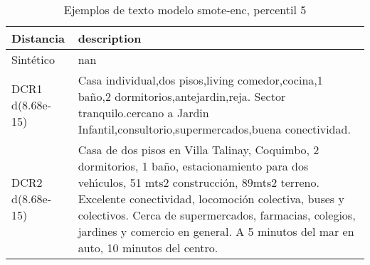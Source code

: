 \begin{table}[H]
\centering
\fontsize{10}{14}\selectfont
\caption{Ejemplos de texto modelo smote-enc, percentil 5}
\label{table-example-economicos-b-2-smote-enc-5p-text}
\begin{tabular}{|l|m{35em}|}
\hline
\rowcolor[gray]{0.8}
Distancia & description \\
\hline Sintético & nan \\
\hline DCR1 d(8.68e-15) & Casa individual,dos pisos,living comedor,cocina,1 ba\~no,2 dormitorios,antejardin,reja.    Sector tranquilo.cercano a Jardin Infantil,consultorio,supermercados,buena conectividad. \\
\hline DCR2 d(8.68e-15) & Casa de dos pisos en Villa Talinay, Coquimbo, 2 dormitorios, 1 ba\~no, estacionamiento para dos veh{\'\i}culos, 51 mts2 construcci\'on, 89mts2 terreno. Excelente conectividad, locomoci\'on colectiva, buses y colectivos. Cerca de supermercados, farmacias, colegios, jardines y comercio en general. A 5 minutos del mar en auto, 10 minutos del centro. \\
\hline
\end{tabular}
\end{table}
